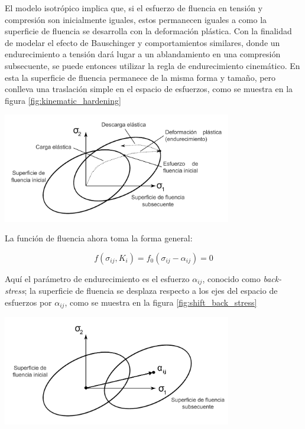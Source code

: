 El modelo isotrópico implica que, si el esfuerzo de fluencia en tensión y compresión son 
inicialmente iguales, estos permanecen iguales a como la superficie de fluencia se desarrolla 
con la deformación plástica. Con la finalidad de modelar el efecto de Bauschinger y comportamientos 
similares, donde un endurecimiento a tensión dará lugar a un ablandamiento en una compresión 
subsecuente, se puede entonces utilizar la regla de endurecimiento cinemático. En esta 
la superficie de fluencia permanece de la misma forma y tamaño, pero conlleva una traslación simple 
en el espacio de esfuerzos, como se muestra en la figura \ref{fig:kinematic_hardening}


\begin{center}
\includegraphics[width=0.75\textwidth]{src/ch2/kinematic_hardening}
\label{fig:kinematic_hardening}
\end{center}

La función de fluencia ahora toma la forma general:

\begin{equation}
f(\sigma_{ij}, K_i) = f_0 (\sigma_{ij} - \alpha_{ij}) = 0
\end{equation}

Aquí el parámetro de endurecimiento es el esfuerzo $\alpha_{ij}$, conocido como \textit{back-stress}; 
la superficie de fluencia se desplaza respecto a los ejes del espacio de esfuerzos por $\alpha_{ij}$, 
como se muestra en la figura \ref{fig:shift_back_stress}

\begin{center}
\includegraphics[width=0.75\textwidth]{src/ch2/shift_back_stress}
\label{fig:shift_back_stress}
\end{center}


